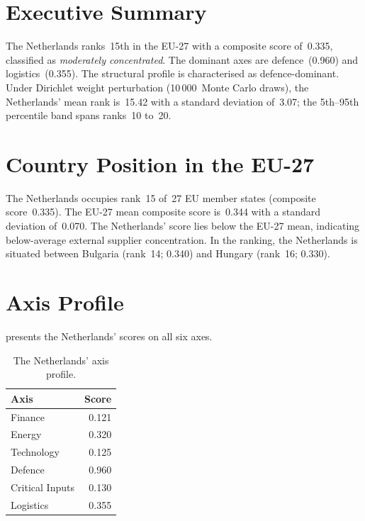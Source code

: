 \documentclass[12pt,a4paper]{article}
\begin{document}
\hypersetup{pageanchor=true}
\pagestyle{fancy}
\renewcommand{\headrulewidth}{0.4pt}


\section{Executive Summary}
\label{sec:summary}

The Netherlands ranks~15th in the EU-27 with a composite \ISI score of~0.335, classified as \emph{moderately concentrated}.  The dominant axes are defence~(0.960) and logistics~(0.355).  The structural profile is characterised as defence-dominant.  Under Dirichlet weight perturbation (10\,000~Monte Carlo draws), the Netherlands' mean rank is~15.42 with a standard deviation of~3.07; the 5th--95th percentile band spans ranks~10 to~20.


\section{Country Position in the EU-27}
\label{sec:position}

The Netherlands occupies rank~15 of~27 EU member states (composite score~0.335).  The EU-27 mean composite score is~0.344 with a standard deviation of~0.070.  The Netherlands' score lies below the EU-27 mean, indicating below-average external supplier concentration.  In the ranking, the Netherlands is situated between Bulgaria (rank~14; 0.340) and Hungary (rank~16; 0.330).


\section{Axis Profile}
\label{sec:axis-profile}

 presents the Netherlands' scores on all six \ISI axes.

\begin{table}[htbp]
\centering\small
\caption{The Netherlands' \ISI axis profile.}
\label{tab:axis-profile}
\begin{tabular}{@{}lr@{}}
\toprule
\textbf{Axis} & \textbf{Score} \\
\midrule
    Finance           & 0.121 \\
    Energy            & 0.320 \\
    Technology        & 0.125 \\
    Defence           & 0.960 \\
    Critical Inputs   & 0.130 \\
    Logistics         & 0.355 \\
\bottomrule
\end{tabular}
\end{table}
\end{document}
